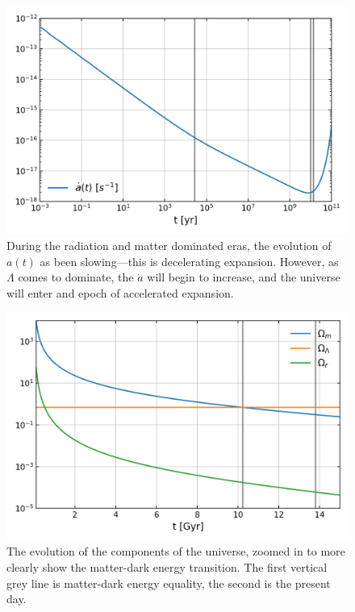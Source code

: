 \begin{figure}[!pth]
\centering     %
    \includegraphics[width=.75\columnwidth]{plots/lcdm_adot.png}
\caption{
    During the radiation and matter dominated eras, the evolution of
    $a(t)$ as been slowing---this is decelerating expansion.
    However, as $\Lambda$ comes to dominate,
    the $\dot{a}$ will begin to increase, and the universe will enter
    and epoch of accelerated expansion.
}\label{fig:lcdm_adot}
\end{figure}
\begin{figure}[!pth]
\centering     %
    \includegraphics[width=.75\columnwidth]{plots/lcdm_components_linear.png}
\caption{
    The evolution of the components of the universe, zoomed in to more clearly
    show the matter-dark energy transition. The first vertical grey line is
    matter-dark energy equality, the second is the present day.
}\label{fig:lcdm_components_linear}
\end{figure}
